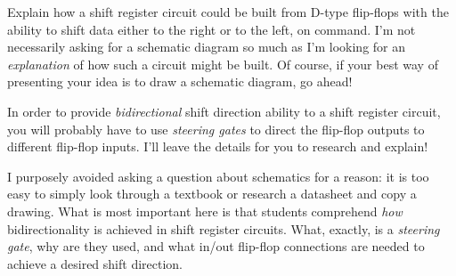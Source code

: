 

Explain how a shift register circuit could be built from D-type flip-flops with the ability to shift data either to the right or to the left, on command.  I'm not necessarily asking for a schematic diagram so much as I'm looking for an {\it explanation} of how such a circuit might be built.  Of course, if your best way of presenting your idea is to draw a schematic diagram, go ahead!







In order to provide {\it bidirectional} shift direction ability to a shift register circuit, you will probably have to use {\it steering gates} to direct the flip-flop outputs to different flip-flop inputs.  I'll leave the details for you to research and explain!







I purposely avoided asking a question about schematics for a reason: it is too easy to simply look through a textbook or research a datasheet and copy a drawing.  What is most important here is that students comprehend {\it how} bidirectionality is achieved in shift register circuits.  What, exactly, is a {\it steering gate}, why are they used, and what in/out flip-flop connections are needed to achieve a desired shift direction.




